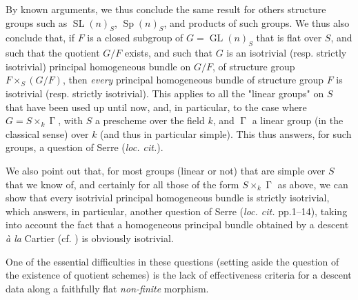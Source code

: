 By known arguments, we thus conclude the same result for others structure groups such as $\operatorname{SL}(n)_S$, $\operatorname{Sp}(n)_S$, and products of such groups.
We thus also conclude that, if $F$ is a closed subgroup of $G=\operatorname{GL}(n)_S$ that is flat over $S$, and such that the quotient $G/F$ exists, and such that $G$ is an isotrivial (resp. strictly isotrivial) principal homogeneous bundle on $G/F$, of structure group $F\times_S(G/F)$, then \emph{every} principal homogeneous bundle of structure group $F$ is isotrivial (resp. strictly isotrivial).
This applies to all the "linear groups" on $S$ that have been used up until now, and, in particular, to the case where $G=S\times_k\operatorname{\Gamma}$, with $S$ a prescheme over the field $k$, and $\operatorname{\Gamma}$ a linear group (in the classical sense) over $k$ (and thus in particular simple).
This thus answers, for such groups, a question of Serre (\emph{loc. cit.}).

We also point out that, for most groups (linear or not) that are simple over $S$ that we know of, and certainly for all those of the form $S\times_k\operatorname{\Gamma}$ as above, we can show that every isotrivial principal homogeneous bundle is strictly isotrivial, which answers, in particular, another question of Serre (\emph{loc. cit.} pp.1–14), taking into account the fact that a homogeneous principal bundle obtained by a descent \emph{à la} Cartier (cf. ) is obviously isotrivial.

\begin{remark}\label{fga3.i-b.6-remark}
    One of the essential difficulties in these questions (setting aside the question of the existence of quotient schemes) is the lack of effectiveness criteria for a descent data along a faithfully flat \emph{non-finite} morphism.
\end{remark}